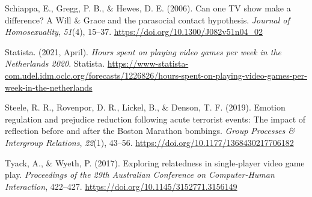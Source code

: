 \documentclass[
  english,
  man, noextraspace,floatsintext]{apa6}
\newlength{\cslhangindent}
\newlength{\cslentryspacingunit} %
\newenvironment{CSLReferences}[2] %
 {%
  \setlength{\parindent}{0pt}
  \ifodd #1
  \let\oldpar\par
  \def\par{\hangindent=\cslhangindent\oldpar}
  \fi
  \setlength{\parskip}{#2\cslentryspacingunit}
 }%
 {}
\begin{document}
\begin{CSLReferences}{1}{0}
\leavevmode{}%
Schiappa, E., Gregg, P. B., \& Hewes, D. E. (2006). Can one {TV} show make a difference? {A Will} \& {Grace} and the parasocial contact hypothesis. \emph{Journal of Homosexuality}, \emph{51}(4), 15--37. \url{https://doi.org/10.1300/J082v51n04_02}

\leavevmode{}%
Statista. (2021, April). \emph{Hours spent on playing video games per week in the {Netherlands} 2020}. {Statista}. \url{https://www-statista-com.udel.idm.oclc.org/forecasts/1226826/hours-spent-on-playing-video-games-per-week-in-the-netherlands}

\leavevmode{}%
Steele, R. R., Rovenpor, D. R., Lickel, B., \& Denson, T. F. (2019). Emotion regulation and prejudice reduction following acute terrorist events: {The} impact of reflection before and after the {Boston Marathon} bombings. \emph{Group Processes \& Intergroup Relations}, \emph{22}(1), 43--56. \url{https://doi.org/10.1177/1368430217706182}

\leavevmode{}%
Tyack, A., \& Wyeth, P. (2017). Exploring relatedness in single-player video game play. \emph{Proceedings of the 29th {Australian Conference} on {Computer}-{Human Interaction}}, 422--427. \url{https://doi.org/10.1145/3152771.3156149}

\end{CSLReferences}
\end{document}
